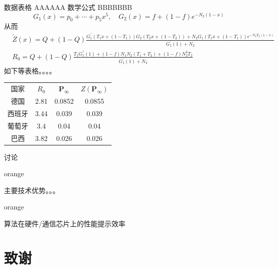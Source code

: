 \documentclass[8pt]{ctexbeamer}
\newenvironment{remark}
{
	\begin{notebox}{orange}
}
{
	\end{notebox}
}
\begin{document}
\begin{frame}{数据表格}
	AAAAAA 数学公式 BBBBBBB
	\begin{equation*}
		G_1 (x) = p_0 + \cdots + p_5 x^5, \quad G_2(x) = f + (1-f)e^{-N_2 (1-x)}
	\end{equation*}
	从而
	\begin{align*}
		&\textstyle	\widetilde{Z}(x) = Q + (1-Q) \frac{G_{1}^{'}(T_1 x + (1-T_1))G_2(T_2 x + (1-T_2)) + N_2 G_{1}(T_1 x + (1-T_1))e^{-N_2 T_2(1-x)}}{G_1^{'}(1) + N_2}\\
		&\textstyle	R_0 = Q + (1-Q)\frac{T_1 G_{1}^{''}(1) + (1-f)N_1 N_2 (T_1 + T_2) + (1-f)N_2^2 T_2}{G_1^{'}(1) + N_2}
	\end{align*}
	如下等表格。。。。
	\begin{center}
		\begin{tabular}{|c|c|c|c|}
			国家	&	$R_0$	&	$\mathbf{P}_{\infty}$	& $Z(\mathbf{P}_{\infty})$	\\
			德国	&	2.81	&	0.0852					& 	0.0855					\\
			西班牙	&	3.44	&	0.039					&	0.039					\\
			葡萄牙	&	3.4		&	0.04					&	0.04					\\ 
			巴西	&	3.82	&	0.026					&	0.026					\\
		\end{tabular}
	\end{center}
\end{frame}

\begin{frame}{讨论}
	\begin{remark}
		主要技术优势。。。
	\end{remark}
	\pause
	\begin{remark}
		算法在硬件/通信芯片上的性能提示效率
	\end{remark}

\end{frame}

\section{致谢}

\begin{frame}
	\begin{center}
		\Huge{}
	\end{center}
\end{frame}
\end{document}
